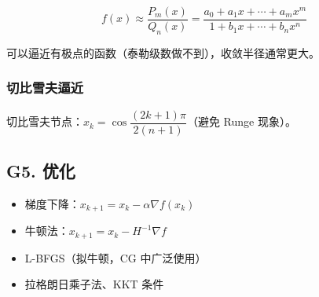 \[
f(x) \approx \frac{P_m(x)}{Q_n(x)} = \frac{a_0 + a_1 x + \cdots + a_m x^m}{1 + b_1 x + \cdots + b_n x^n}
\]

可以逼近有极点的函数（泰勒级数做不到），收敛半径通常更大。

\subsubsection{切比雪夫逼近}

切比雪夫节点：$x_k = \cos\dfrac{(2k+1)\pi}{2(n+1)}$（避免 Runge 现象）。

\subsection{G5. 优化}

\begin{itemize}
  \item 梯度下降：$x_{k+1} = x_k - \alpha \nabla f(x_k)$
  \item 牛顿法：$x_{k+1} = x_k - H^{-1}\nabla f$
  \item L-BFGS（拟牛顿，CG 中广泛使用）
  \item 拉格朗日乘子法、KKT 条件
\end{itemize}